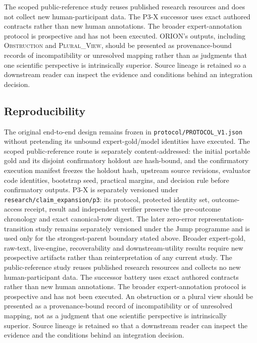 The scoped public-reference study reuses published research resources and does not collect new human-participant data. The P3-X successor uses exact authored contracts rather than new human annotations. The broader expert-annotation protocol is prospective and has not been executed. ORION's outputs, including \textsc{Obstruction} and \textsc{Plural\_View}, should be presented as provenance-bound records of incompatibility or unresolved mapping rather than as judgments that one scientific perspective is intrinsically superior. Source lineage is retained so a downstream reader can inspect the evidence and conditions behind an integration decision.

\subsection{Reproducibility}

The original end-to-end design remains frozen in \texttt{protocol/PROTOCOL\_V1.json} without pretending its unbound expert-gold/model identities have executed. The scoped public-reference route is separately content-addressed: the initial portable gold and its disjoint confirmatory holdout are hash-bound, and the confirmatory execution manifest freezes the holdout hash, upstream source revisions, evaluator code identities, bootstrap seed, practical margins, and decision rule before confirmatory outputs. P3-X is separately versioned under \texttt{research/claim\_expansion/p3}: its protocol, protected identity set, outcome-access receipt, result and independent verifier preserve the pre-outcome chronology and exact canonical-row digest. The later zero-error representation-transition study remains separately versioned under the Jump programme and is used only for the strongest-parent boundary stated above. Broader expert-gold, raw-text, live-engine, recoverability and downstream-utility results require new prospective artifacts rather than reinterpretation of any current study.
The public-reference study reuses published research resources and collects no
new human-participant data. The successor battery uses exact authored
contracts rather than new human annotations. The broader expert-annotation
protocol is prospective and has not been executed. An obstruction or a plural
view should be presented as a provenance-bound record of incompatibility or of
unresolved mapping, not as a judgment that one scientific perspective is
intrinsically superior. Source lineage is retained so that a downstream reader
can inspect the evidence and the conditions behind an integration decision.

\endinput
